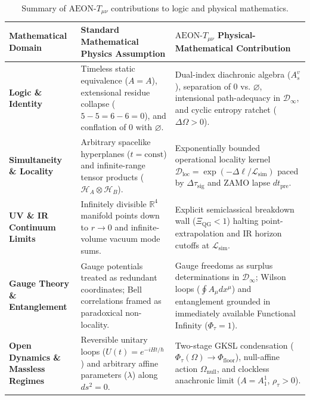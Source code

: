 \documentclass[11pt,a4paper]{article}
\begin{document}
\begin{table}[htbp]
\centering
\small
\renewcommand{\arraystretch}{1.35}
\begin{tabularx}{\textwidth}{>{\raggedright\arraybackslash}p{2.8cm} >{\raggedright\arraybackslash}p{5.5cm} >{\raggedright\arraybackslash}X}
\toprule
\textbf{Mathematical Domain} & \textbf{Standard Mathematical Physics Assumption} & \textbf{$\text{AEON-}T_{\mu\nu}$ Physical-Mathematical Contribution} \\
\midrule
\textbf{Logic \& Identity} & Timeless static equivalence ($A = A$), extensional residue collapse ($5-5 = 6-6 = 0$), and conflation of $0$ with $\varnothing$. & Dual-index diachronic algebra ($A_s^v$), separation of $0$ vs. $\varnothing$, intensional path-adequacy in $\mathcal{D}_\infty$, and cyclic entropy ratchet ($\Delta\Omega > 0$). \\
\textbf{Simultaneity \& Locality} & Arbitrary spacelike hyperplanes ($t = \mathrm{const}$) and infinite-range tensor products ($\mathcal{H}_A \otimes \mathcal{H}_B$). & Exponentially bounded operational locality kernel $\mathcal{D}_{\mathrm{loc}} = \exp(-\Delta\ell / \mathcal{L}_{\mathrm{sim}})$ paced by $\Delta\tau_{\mathrm{sig}}$ and ZAMO lapse $dt_{\mathrm{pre}}$. \\
\textbf{UV \& IR Continuum Limits} & Infinitely divisible $\mathbb{R}^4$ manifold points down to $r \to 0$ and infinite-volume vacuum mode sums. & Explicit semiclassical breakdown wall ($\Xi_{\mathrm{QG}} < 1$) halting point-extrapolation and IR horizon cutoffs at $\mathcal{L}_{\mathrm{sim}}$. \\
\textbf{Gauge Theory \& Entanglement} & Gauge potentials treated as redundant coordinates; Bell correlations framed as paradoxical non-locality. & Gauge freedoms as surplus determinations in $\mathcal{D}_\infty$; Wilson loops ($\oint A_\mu dx^\mu$) and entanglement grounded in immediately available Functional Infinity ($\Phi_\tau = 1$). \\
\textbf{Open Dynamics \& Massless Regimes} & Reversible unitary loops ($U(t) = e^{-iHt/\hbar}$) and arbitrary affine parameters ($\lambda$) along $ds^2 = 0$. & Two-stage GKSL condensation ($\Phi_\tau(\Omega) \to \Phi_{\mathrm{floor}}$), null-affine action $\Omega_{\mathrm{null}}$, and clockless anachronic limit ($A = A_1^1$, $\rho_\tau > 0$). \\
\bottomrule
\end{tabularx}
\caption{Summary of $\text{AEON-}T_{\mu\nu}$ contributions to logic and physical mathematics.}
\label{tab:comparison}
\end{table}
\end{document}
